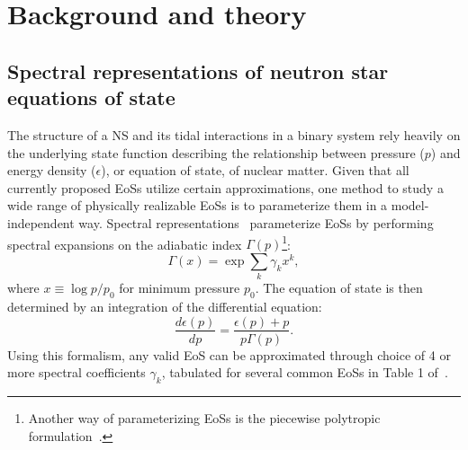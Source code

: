 \documentclass[prd,twocolumn,nofootinbib,superscriptaddress,amsmath,amssymb]{revtex4-1}
\begin{document}
\section{Background and theory}\label{sec:theory}

\subsection{Spectral representations of neutron star equations of state}\label{sec:eos}
The structure of a NS and its tidal interactions in a binary system rely heavily on the underlying state function describing the relationship between pressure ($p$) and energy density ($\epsilon$), or equation of state, of nuclear matter.
Given that all currently proposed EoSs utilize certain approximations, one method to study a wide range of physically realizable EoSs is to parameterize them in a model-independent way.
Spectral representations~\cite{Lindblom:2010bb,Lindblom:2012zi,Lindblom:2013kra,Lindblom:2018rfr,Abbott:2018exr} parameterize EoSs by performing spectral expansions on the adiabatic index $\Gamma(p)$\footnote{Another way of parameterizing EoSs is the piecewise polytropic formulation~\cite{Read2009,Lackey:2014fwa,Carney:2018sdv}.}:
\begin{equation}
\Gamma(x) = \exp{\sum_k\gamma_k x^k},
\end{equation}
where $x \equiv \log{p/p_0}$ for minimum pressure $p_0$.
The equation of state is then determined by an integration of the differential equation:
\begin{equation}
\frac{d \epsilon(p)}{dp}=\frac{\epsilon(p)+p}{p \Gamma(p)}.
\end{equation}
Using this formalism, any valid EoS can be approximated through choice of 4 or more spectral coefficients $\gamma_k$, tabulated for several common EoSs in Table 1 of~\cite{Lindblom:2018rfr}.
\end{document}
